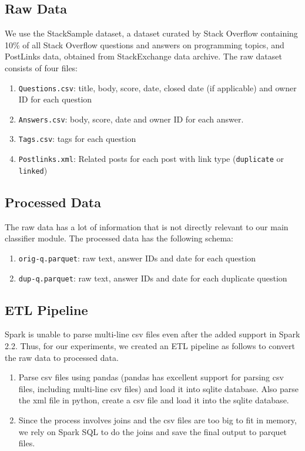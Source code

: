 \documentclass{article}
\begin{document}
\subsection{Raw Data}
We use the StackSample\cite{dataset} dataset, a dataset curated by Stack Overflow containing 10\% of all Stack Overflow questions and answers on programming topics, and PostLinks data, obtained from StackExchange data archive. The raw dataset consists of four files:
\begin{enumerate}
	\item \texttt{Questions.csv}: title, body, score, date, closed date (if applicable) and owner ID for each question
	\item \texttt{Answers.csv}: body, score, date and owner ID for each answer.
	\item \texttt{Tags.csv}: tags for each question
	\item \texttt{Postlinks.xml}: Related posts for each post with link type (\texttt{duplicate} or \texttt{linked})
\end{enumerate}

\subsection{Processed Data}
The raw data has a lot of information that is not directly relevant to our main classifier module. The processed data has the following schema:
\begin{enumerate}
	\item \texttt{orig-q.parquet}: raw text, answer IDs and date for each question
	\item \texttt{dup-q.parquet}: raw text, answer IDs and date for each duplicate question
\end{enumerate}

\subsection{ETL Pipeline}
Spark\cite{spark} is unable to parse multi-line csv files even after the added support in Spark 2.2. Thus, for our experiments, we created an ETL pipeline as follows to convert the raw data to processed data.
\begin{enumerate}
	\item Parse csv files using pandas\cite{pandas} (pandas has excellent support for parsing csv files, including multi-line csv files) and load it into sqlite database. Also parse the xml file in python, create a csv file and load it into the sqlite\cite{sqlite} database.
	\item Since the process involves joins and the csv files are too big to fit in memory, we rely on Spark SQL to do the joins and save the final output to parquet files.
\end{enumerate}
\end{document}
